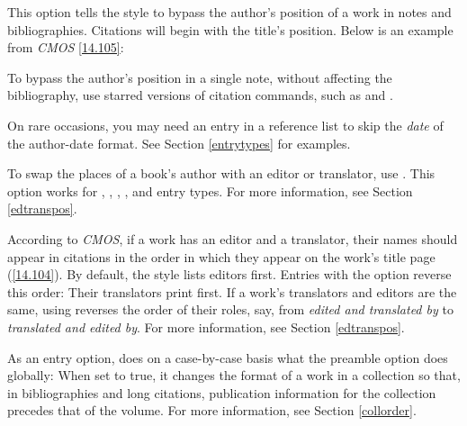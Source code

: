\documentclass[11pt,letterpaper,oneside]{article}
\begin{document}
\begin{optionlist}

\noindent This option tells the style to bypass the author's position
of a work in notes and bibliographies. Citations will begin with the
title's position. Below is an example from \textit{CMOS} \ref{14.105}:

\begin{citebib}
\item \cite{chaucer1966}
\end{citebib}

\noindent To bypass the author's position in a single note, without
affecting the bibliography, use starred versions of citation commands,
such as  and .


\noindent On rare occasions, you may need an entry in a reference list
to skip the \textit{date} of the author-date format. See Section
\ref{entrytypes} for examples.


\noindent To swap the places of a book's author with an editor or
translator, use . This option works for ,
, , , and
 entry types. For more information, see Section
\ref{edtranspos}.


\noindent According to \textit{CMOS}, if a work has an editor and a
translator, their names should appear in citations in the order in
which they appear on the work's title page (\ref{14.104}). By default,
the style lists editors first. Entries with the option
 reverse this order: Their translators print
first. If a work's translators and editors are the same, using
 reverses the order of their roles, say, from
\textit{edited and translated by} to \textit{translated and edited
by}. For more information, see Section \ref{edtranspos}.


\noindent As an entry option,  does on a case-by-case
basis what the  preamble option does globally: When set
to true, it changes the format of a work in a collection so that, in
bibliographies and long citations, publication information for the
collection precedes that of the volume. For more information, see
Section \ref{collorder}.

\end{optionlist}
\end{document}
